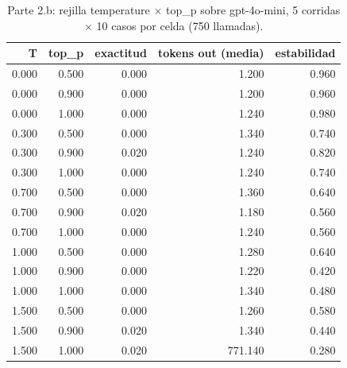 \begin{table}[H]\centering\caption{Parte 2.b: rejilla temperature $\times$ top\_p sobre gpt-4o-mini, 5 corridas $\times$ 10 casos por celda (750 llamadas).}\label{tab:p2b}
{\footnotesize\setlength{\tabcolsep}{3.5pt}
\begin{tabular}{rrrrr}
\hline
T & top\_p & exactitud & tokens out (media) & estabilidad \\
\hline
0.000 & 0.500 & 0.000 & 1.200 & 0.960 \\
0.000 & 0.900 & 0.000 & 1.200 & 0.960 \\
0.000 & 1.000 & 0.000 & 1.240 & 0.980 \\
0.300 & 0.500 & 0.000 & 1.340 & 0.740 \\
0.300 & 0.900 & 0.020 & 1.240 & 0.820 \\
0.300 & 1.000 & 0.000 & 1.240 & 0.740 \\
0.700 & 0.500 & 0.000 & 1.360 & 0.640 \\
0.700 & 0.900 & 0.020 & 1.180 & 0.560 \\
0.700 & 1.000 & 0.000 & 1.240 & 0.560 \\
1.000 & 0.500 & 0.000 & 1.280 & 0.640 \\
1.000 & 0.900 & 0.000 & 1.220 & 0.420 \\
1.000 & 1.000 & 0.000 & 1.340 & 0.480 \\
1.500 & 0.500 & 0.000 & 1.260 & 0.580 \\
1.500 & 0.900 & 0.020 & 1.340 & 0.440 \\
1.500 & 1.000 & 0.020 & 771.140 & 0.280 \\
\hline
\end{tabular}
}\end{table}
